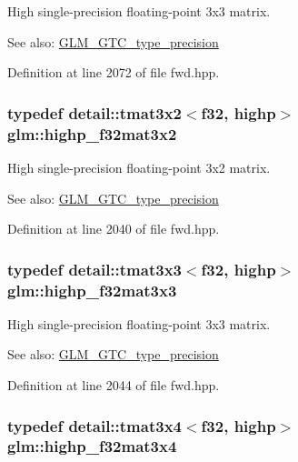 High single-precision floating-point 3x3 matrix. \begin{Desc}
\item[See also:]\hyperlink{group__gtc__type__precision}{GLM\_\-GTC\_\-type\_\-precision} \end{Desc}


Definition at line 2072 of file fwd.hpp.\hypertarget{group__gtc__type__precision_gf36b2b34ea881977c61491b0d3b25a28}{
\subsubsection[highp\_\-f32mat3x2]{\setlength{\rightskip}{0pt plus 5cm}typedef detail::tmat3x2$<$f32, highp$>$ {\bf glm::highp\_\-f32mat3x2}}}
\label{group__gtc__type__precision_gf36b2b34ea881977c61491b0d3b25a28}


High single-precision floating-point 3x2 matrix. \begin{Desc}
\item[See also:]\hyperlink{group__gtc__type__precision}{GLM\_\-GTC\_\-type\_\-precision} \end{Desc}


Definition at line 2040 of file fwd.hpp.\hypertarget{group__gtc__type__precision_g334eca23d23aef90972fb20c5b749ca3}{
\subsubsection[highp\_\-f32mat3x3]{\setlength{\rightskip}{0pt plus 5cm}typedef detail::tmat3x3$<$f32, highp$>$ {\bf glm::highp\_\-f32mat3x3}}}
\label{group__gtc__type__precision_g334eca23d23aef90972fb20c5b749ca3}


High single-precision floating-point 3x3 matrix. \begin{Desc}
\item[See also:]\hyperlink{group__gtc__type__precision}{GLM\_\-GTC\_\-type\_\-precision} \end{Desc}


Definition at line 2044 of file fwd.hpp.\hypertarget{group__gtc__type__precision_ga71f504ecb02f9178026b01013b77ba0}{
\subsubsection[highp\_\-f32mat3x4]{\setlength{\rightskip}{0pt plus 5cm}typedef detail::tmat3x4$<$f32, highp$>$ {\bf glm::highp\_\-f32mat3x4}}}
\label{group__gtc__type__precision_ga71f504ecb02f9178026b01013b77ba0}


